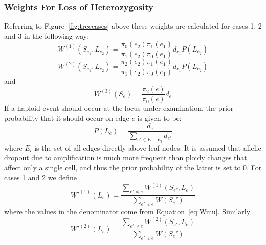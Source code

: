 \documentclass[../../main.tex]{subfiles}
\begin{document}
\subsubsection*{Weights For Loss of Heterozygosity}
 Referring to Figure~\ref{fig:treecases} above these weights are calculated for cases 1, 2 and 3 in the following way:
\begin{equation*}
W^{(1)}(S_{e_1},L_{e_2}) = \frac{\pi_0(e_2)\pi_1(e_1)}{\pi_1(e_2)\pi_0(e_1)}d_{e_1}P(L_{e_2})
\end{equation*}
\begin{equation*}
W^{(2)}(S_{e_1},L_{e_2}) = \frac{\pi_2(e_2)\pi_1(e_1)}{\pi_1(e_2)\pi_0(e_1)}d_{e_1}P(L_{e_2})
\end{equation*}
and
\begin{equation*}
W^{(3)}(S_e) = \frac{\pi_2(e)}{\pi_0(e)}d_e
\end{equation*} 
If a haploid event should occur at the locus under examination, the prior probability that it should occur on edge $e$ is given to be: %
\begin{equation*}
P(L_e) = \frac{d_e}{\sum_{e'\in E-E_l} d_{e'}}
\end{equation*}
where $E_l$ is the set of all edges directly above leaf nodes. It is assumed that allelic dropout due to amplification is much more frequent than ploidy changes that affect only a single cell, and thus the prior probability of the latter is set to 0. For cases 1 and 2 we define
\begin{equation*}
W'^{(1)}(L_e) = \frac{\sum_{e' \preceq e} W^{(1)}(S_{e'},L_e)}{\sum_{e' \preceq e}W(S_e')} 
\end{equation*}
where the values in the denominator come from Equation~\eqref{eq:Wmu}. Similarly
\begin{equation*}
W'^{(2)}(L_e) = \frac{\sum_{e' \preceq e} W^{(2)}(S_{e'},L_e)}{\sum_{e' \preceq e}W(S_e')} 
\end{equation*}
\end{document}
